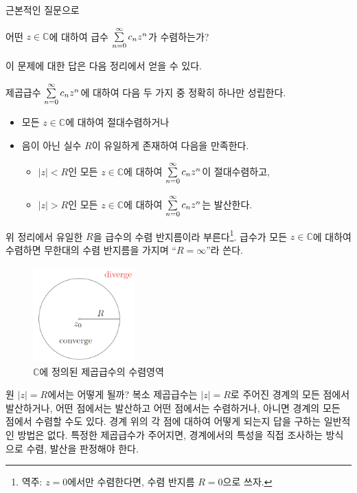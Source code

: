 근본적인 질문으로 
\begin{center}
어떤 $z\in\mathbb C$에 대하여  급수 $\sum\limits_{n=0}^\infty c_nz^n$가 수렴하는가?
\end{center}
이 문제에 대한 답은 다음 정리에서 얻을 수 있다.

\begin{salttheorem}{}{} \label{thm-4-1}
제곱급수 $\sum\limits_{n=0}^\infty c_nz^n$에 대하여
다음 두 가지 중 정확히 하나만 성립한다.
\begin{itemize}
\item[(1)] 모든 $z\in\mathbb C$에 대하여 절대수렴하거나
\item[(2)] 음이 아닌 실수 $R$이 유일하게 존재하여 다음을 만족한다.
\begin{itemize}
\item[(a)] $|z|<R$인 모든 $z\in\mathbb C$에 대하여 $\sum\limits_{n=0}^\infty c_nz^n$이 절대수렴하고,
\item[(b)] $|z|>R$인 모든 $z\in\mathbb C$에 대하여 $\sum\limits_{n=0}^\infty c_nz^n$는 발산한다.
\end{itemize}
\end{itemize}
\end{salttheorem}

위 정리에서 유일한 $R$을 급수의 수렴 반지름이라 
부른다\footnote{
역주:   $z=0$에서만 수렴한다면, 수렴 반지름 $R=0$으로 쓰자.
}.
급수가 모든 $z\in\mathbb C$에 대하여 수렴하면
무한대의 수렴 반지름을 가지며 ``$R=\infty$''라 쓴다.

\begin{figure}[h!]
\begin{center}
\includegraphics[width=0.35\textwidth]{./SaltChapter/figs/fig-4-1}
\end{center}
\caption{$\mathbb C$에 정의된 제곱급수의 수렴영역}
\label{fig-4-1}
\end{figure}

원 $|z|=R$에서는 어떻게 될까?
복소 제곱급수는 $|z|=R$로 주어진 경계의 모든 점에서 발산하거나,
어떤 점에서는 발산하고 어떤 점에서는 수렴하거나,
아니면 경계의 모든 점에서 수렴할 수도 있다.
경계 위의 각 점에 대하여 어떻게 되는지 답을 구하는 일반적인 방법은 없다.
특정한 제곱급수가 주어지면, 경계에서의 특성을 직접 조사하는 방식으로 수렴, 발산을 판정해야 한다.

